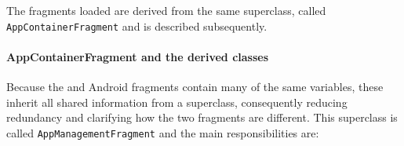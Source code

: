 The fragments loaded are derived from the same superclass, called \lstinline|AppContainerFragment| and is described subsequently.
%



 

\paragraph{AppContainerFragment and the derived classes}

Because the \giraf and Android fragments contain many of the same variables, these inherit all shared information from a superclass, consequently reducing redundancy and clarifying how the two fragments are different.
This superclass is called \lstinline!AppManagementFragment! and the main responsibilities are:


